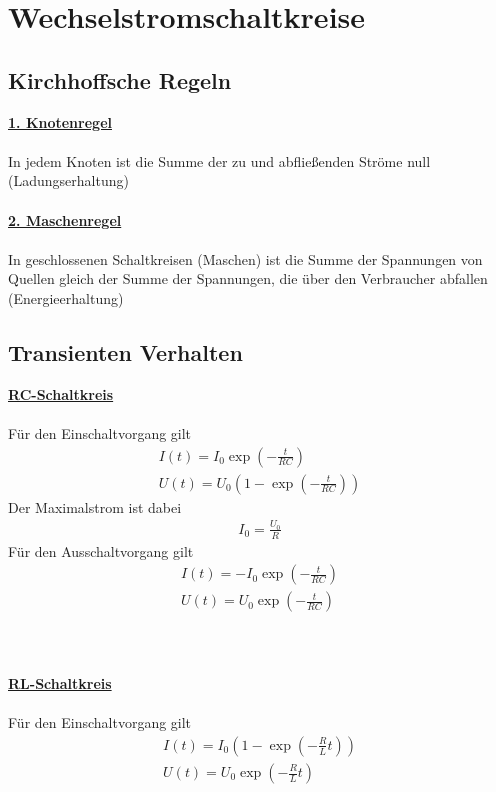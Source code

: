\documentclass[a4paper,12pt]{report}
\begin{document}
\section{Wechselstromschaltkreise}

\subsection{Kirchhoffsche Regeln}

\underline{\textbf{1. Knotenregel}} \\\\
In jedem Knoten ist die Summe der zu und abfließenden Ströme null (Ladungserhaltung)\\\\

\underline{\textbf{2. Maschenregel}} \\\\
In geschlossenen Schaltkreisen (Maschen) ist die Summe der Spannungen von Quellen gleich der Summe der Spannungen, die über den Verbraucher abfallen (Energieerhaltung) 

\subsection{Transienten Verhalten}

\underline{\textbf{RC-Schaltkreis}} \\\\
Für den Einschaltvorgang gilt 
\begin{align}
I(t) = I_0\exp(-\frac{t}{RC}) \\
U(t) = U_0 (1 - \exp(-\frac{t}{RC}))
\end{align}
Der Maximalstrom ist dabei 
\begin{align}
I_0 = \frac{U_0}{R}
\end{align}
Für den Ausschaltvorgang gilt 
\begin{align}
I(t) = -I_0\exp(-\frac{t}{RC}) \\
U(t) = U_0\exp(-\frac{t}{RC})
\end{align} \\\\\\


\underline{\textbf{RL-Schaltkreis}} \\\\
Für den Einschaltvorgang gilt 
\begin{align}
I(t) = I_0 (1 - \exp(-\frac{R}{L} t)) \\
U(t) = U_0\exp(-\frac{R}{L} t)
\end{align}
\end{document}
